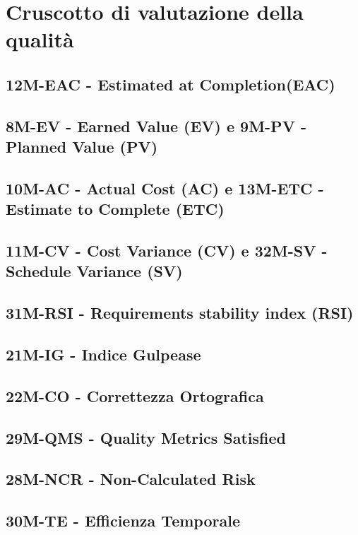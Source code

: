 \section{Cruscotto di valutazione della qualità}
\subsection{12M-EAC - Estimated at Completion(EAC)}
\subsection{8M-EV - Earned Value (EV) e 9M-PV - Planned Value (PV)}
\subsection{10M-AC - Actual Cost (AC) e 13M-ETC - Estimate to Complete (ETC)}
\subsection{11M-CV - Cost Variance (CV) e 32M-SV - Schedule Variance (SV)}
\subsection{31M-RSI - Requirements stability index (RSI)}
\subsection{21M-IG - Indice Gulpease}
\subsection{22M-CO - Correttezza Ortografica}
\subsection{29M-QMS - Quality Metrics Satisfied}
\subsection{28M-NCR - Non-Calculated Risk}
\subsection{30M-TE - Efficienza Temporale}
